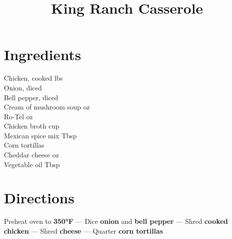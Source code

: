 \documentclass[11pt,letterpaper]{article}
\title{King Ranch Casserole}
\author{}
\date{}
\begin{document}
\maketitle
\thispagestyle{empty}

\section*{Ingredients}
\setlength{\columnsep}{20pt}
\begin{multicols}{2}
\noindent
    Chicken, cooked  lbs \\
    Onion, diced  \\
    Bell pepper, diced  \\
    Cream of mushroom soup  oz \\
    Ro-Tel  oz \\
    Chicken broth  cup \\
    Mexican spice mix  Tbsp \\
    Corn tortillas   \\
    Cheddar cheese  oz \\
    Vegetable oil  Tbsp
\end{multicols}

\section*{Directions}

\noindent
Preheat oven to \textbf{350°F} ---
Dice \textbf{onion} and \textbf{bell pepper} ---
Shred \textbf{cooked chicken} ---
Shred \textbf{cheese} ---
Quarter \textbf{corn tortillas}
\end{document}
